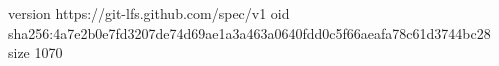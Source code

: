 version https://git-lfs.github.com/spec/v1
oid sha256:4a7e2b0e7fd3207de74d69ae1a3a463a0640fdd0c5f66aeafa78c61d3744bc28
size 1070

